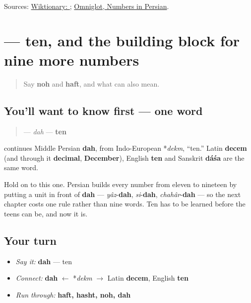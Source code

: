 \begin{tcolorbox}[breakable,colback=teal!4,colframe=teal!35!black,title={Before you move on}]
Sources: \href{https://en.wiktionary.org/wiki/\%D9\%86\%D9\%87}{Wiktionary: }; \href{https://www.omniglot.com/language/numbers/persian.htm}{Omniglot, Numbers in Persian}.
\end{tcolorbox}
\section[\texorpdfstring{\fa{ده} (dah)}{ده (dah)}]{ — ten, and the building block for nine more numbers}

\label{lesson:FA-C17-dah}



\begin{quote}
Say \textbf{noh} and \textbf{haft}, and what \textbf{} can also mean.
\end{quote}

\subsection*{You'll want to know first — one word}
\begin{quote}
\textbf{} — \emph{dah} — \textbf{ten}
\end{quote}

\begin{cousinweb}
\textbf{} continues Middle Persian \textbf{dah}, from Indo-European *\emph{dekm}, \textquotedblleft{}ten.\textquotedblright{} Latin \textbf{decem} (and through it \textbf{decimal}, \textbf{December}), English \textbf{ten} and Sanskrit \textbf{dáśa} are the same word.

Hold on to this one. Persian builds every number from eleven to nineteen by putting a unit in front of \textbf{dah} — \emph{yâz}-\textbf{dah}, \emph{si}-\textbf{dah}, \emph{chahâr}-\textbf{dah} — so the next chapter costs one rule rather than nine words. Ten has to be learned before the teens can be, and now it is.
\end{cousinweb}

\subsection*{Your turn}
\begin{itemize}
\raggedright
  \item \emph{Say it:} \textbf{dah} — ten
  \item \emph{Connect:} \textbf{dah} $\leftarrow$ *\emph{dekm} $\to$ Latin \textbf{decem}, English \textbf{ten}
  \item \emph{Run through:} \textbf{haft, hasht, noh, dah}
\end{itemize}

